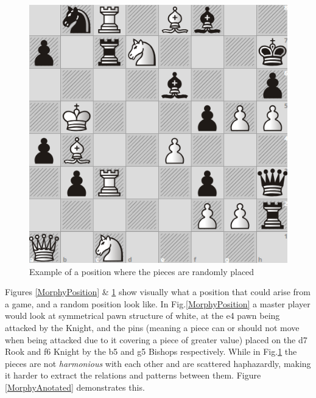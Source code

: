\begin{figure}[H]
    \centering
    \includegraphics[scale=0.45]{images/RandomPosition.png}
    \caption{Example of a position where the pieces are randomly placed}
    \label{RandomPosition}
\end{figure}

Figures \ref{MorphyPosition} \& \ref{RandomPosition} show visually what a position that could arise from a game, and a random position look like. In Fig.\ref{MorphyPosition} a master player would look at symmetrical pawn structure of white, at the e4 pawn being attacked by the Knight, and the pins (meaning a piece can or should not move when being attacked due to it covering a piece of greater value) placed on the d7 Rook and f6 Knight by the b5 and g5 Bishops respectively. While in Fig.\ref{RandomPosition} the pieces are not \textit{harmonious} with each other and are scattered haphazardly, making it harder to extract the relations and patterns between them. Figure \ref{MorphyAnotated} demonstrates this.

